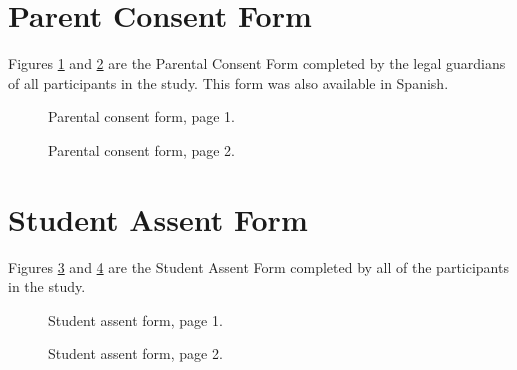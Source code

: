 \section{Parent Consent Form}  \label{sec:parent_consent}
	Figures \ref{fig:consent1} and \ref{fig:consent2} are the Parental Consent Form completed by the legal guardians of all participants in the study. This form was also available in Spanish.



	\begin{figure}%
   	\centering
   		\fbox{
   		}
   	\caption{Parental consent form, page 1.}
   	\label{fig:consent1}
	\end{figure}

	\begin{figure}%
   	\centering
   		\fbox{
   		}
   	\caption{Parental consent form, page 2.}
   	\label{fig:consent2}
	\end{figure}

\section{Student Assent Form} \label{sec:student_assent}

	Figures \ref{fig:assent1} and \ref{fig:assent2} are the Student Assent Form completed by all of the participants in the study.


	\begin{figure}%
   	\centering
   		\fbox{
   		}
   	\caption{Student assent form, page 1.}
   	\label{fig:assent1}
	\end{figure}

	\begin{figure}%
   	\centering
   		\fbox{
   		}
   	\caption{Student assent form, page 2.}
   	\label{fig:assent2}
	\end{figure}
